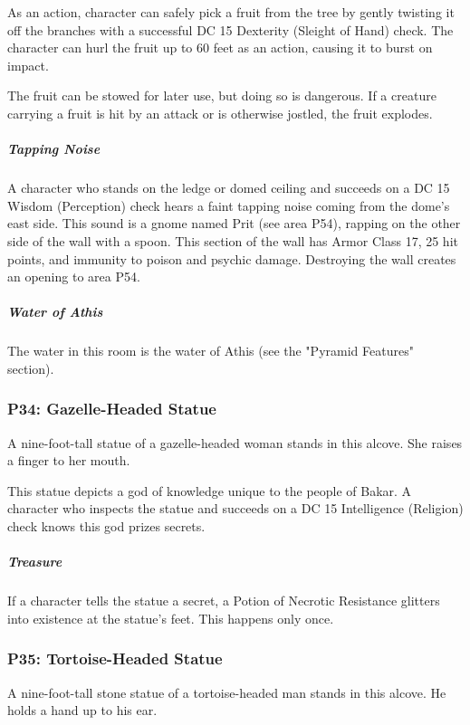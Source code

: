 \documentclass[10pt,a4paper,twoside,bg=print,twocolumn,openany,nodeprecatedcode]{dndbook}
\begin{document}
As an action, character can safely pick a fruit from the tree by gently twisting it off the branches with a successful DC 15 Dexterity (Sleight of Hand) check. The character can hurl the fruit up to 60 feet as an action, causing it to burst on impact.

The fruit can be stowed for later use, but doing so is dangerous. If a creature carrying a fruit is hit by an attack or is otherwise jostled, the fruit explodes.

\subparagraph{Tapping Noise}
A character who stands on the ledge or domed ceiling and succeeds on a DC 15 Wisdom (Perception) check hears a faint tapping noise coming from the dome's east side. This sound is a gnome named Prit (see area P54), rapping on the other side of the wall with a spoon. This section of the wall has Armor Class 17, 25 hit points, and immunity to poison and psychic damage. Destroying the wall creates an opening to area P54.

\subparagraph{Water of Athis}
The water in this room is the water of Athis (see the "Pyramid Features" section).

\subsubsection{P34: Gazelle-Headed Statue}
\begin{DndReadAloud}{}
A nine-foot-tall statue of a gazelle-headed woman stands in this alcove. She raises a finger to her mouth.

\end{DndReadAloud}

This statue depicts a god of knowledge unique to the people of Bakar. A character who inspects the statue and succeeds on a DC 15 Intelligence (Religion) check knows this god prizes secrets.

\subparagraph{Treasure}
If a character tells the statue a secret, a Potion of Necrotic Resistance glitters into existence at the statue's feet. This happens only once.

\subsubsection{P35: Tortoise-Headed Statue}
\begin{DndReadAloud}{}
A nine-foot-tall stone statue of a tortoise-headed man stands in this alcove. He holds a hand up to his ear.

\end{DndReadAloud}
\end{document}
